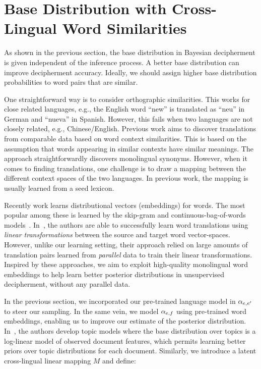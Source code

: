 \section{Base Distribution with Cross-Lingual Word Similarities}

As shown in the previous section, the base distribution in Bayesian decipherment is given independent of the inference process. 
A better base distribution can improve decipherment accuracy. Ideally, we should assign higher base distribution probabilities to word pairs that are similar.

One straightforward way is to consider orthographic similarities. This works for close related languages, e.g., the English word ``new'' is translated as ``neu'' in German and ``nueva'' in Spanish. However, this fails when two languages are not closely related, e.g., Chinese/English. Previous work aims to discover translations from comparable data based on word context similarities. This is based on the assumption that words appearing in similar contexts have similar meanings. The approach straightforwardly discovers monolingual synonyms. However, when it comes to finding translations, one challenge is to draw a mapping between the different context spaces of the two languages. In previous work, the mapping is usually learned from a seed lexicon.

Recently work learns distributional vectors (embeddings) for words. The most popular among these is learned by the skip-gram and continuous-bag-of-words models~\cite{mikolov2013efficient}. In~\cite{mikolov2013exploiting}, the authors are  able to successfully learn word translations using {\em linear transformations} between the source and target word vector-spaces. However, unlike our learning setting, their approach relied on large amounts of translation pairs learned from \emph{parallel} data to train their linear transformations. Inspired by these approaches, we aim to exploit high-quality monolingual word embeddings to help learn better posterior distributions in unsupervised decipherment, without any parallel data.

In the previous section, we incorporated our pre-trained language model in $\alpha_{e,e'}$ to steer our sampling. In the same vein, we model $\alpha_{e,f}$ using pre-trained word embeddings, enabling us to improve our estimate of the posterior distribution. In~\cite{mimno2012topic}, the authors develop topic models where the base distribution over topics is a log-linear model of observed document features, which permits learning better priors over topic distributions for each document. Similarly, we introduce a latent cross-lingual linear mapping $M$ and define:


